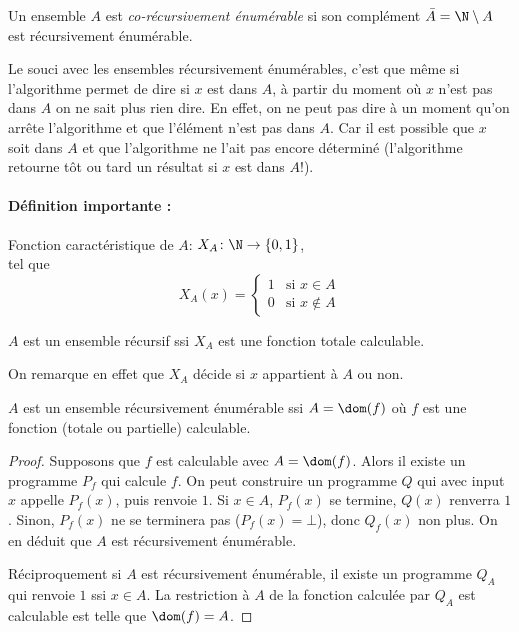 \begin{mydef}
  Un ensemble $A$ est \emph{co-récursivement énumérable}
  si son complément $\bar{A} = \N \setminus A$ est récursivement énumérable.
\end{mydef}

\begin{myrem}
	Le souci avec les ensembles récursivement énumérables,
	c'est que même si l'algorithme permet de dire si $x$ est dans $A$, à partir du moment où $x$
	n'est pas dans $A$ on ne sait plus rien dire. En effet, on ne peut pas dire à un moment qu'on
	arrête l'algorithme et que l'élément n'est pas dans $A$.
       	Car il est possible que $x$ soit dans $A$ et que l'algorithme ne
	l'ait pas encore déterminé (l'algorithme retourne tôt ou tard un
	résultat si $x$ est dans $A$!).
\end{myrem}

\paragraph{Définition importante :}
\label{par:d_finition_importante}

\begin{mydef}
	Fonction caractéristique de $A$:
	$X_A \colon \N \to \{0,1\}$, \\
	tel que
    \[ X_A(x) =
      \begin{cases}
        1 & \text{si }x \in A \\
        0 & \text{si }x \notin A
      \end{cases}
    \]
\end{mydef}

\begin{myprop}
	$A$ est un ensemble récursif ssi $X_A$ est une fonction totale	calculable.

    On remarque en effet que $X_A$ décide si $x$ appartient à $A$ ou non.
\end{myprop}

\begin{myprop}
	$A$ est un ensemble récursivement énumérable ssi $A = \dom(f)$ où $f$ est une fonction (totale ou partielle) calculable.

    \begin{proof}
      Supposons que $f$ est calculable avec $A=\dom(f)$. Alors
      il existe un programme $P_f$ qui calcule $f$.
      On peut construire un programme $Q$ qui avec input $x$
      appelle $P_f(x)$, puis renvoie $1$.
      Si $x\in A$, $P_f(x)$ se termine, $Q(x)$ renverra $1$. Sinon, $P_f(x)$ ne se terminera pas ($P_f(x) =\bot$), donc $Q_f(x)$ non plus. On en déduit que $A$ est récursivement énumérable.

      Réciproquement si $A$ est récursivement énumérable, il existe un programme $Q_A$ qui renvoie $1$ ssi $x\in A$. La restriction à $A$ de la fonction calculée par $Q_A$ est calculable est telle que $\dom(f) = A$.
    \end{proof}
\end{myprop}

